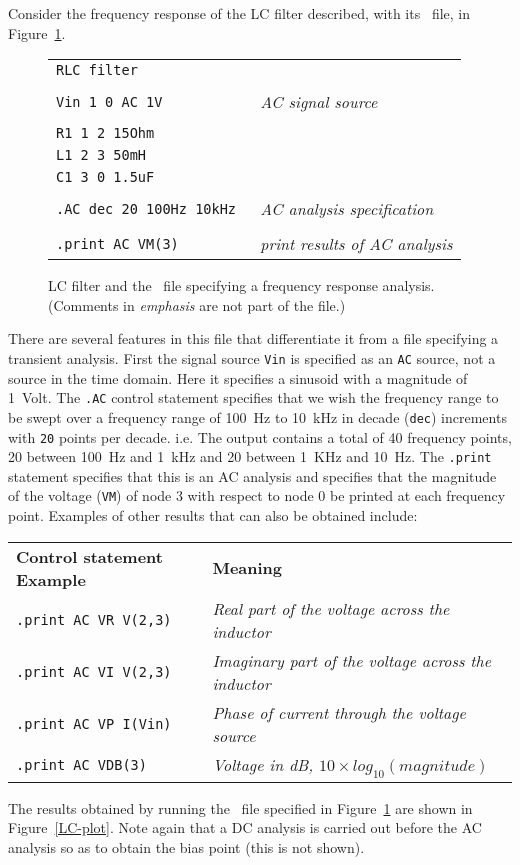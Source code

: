 Consider the frequency response of the LC filter described, with
its \spice\ file, in Figure~\ref{LC}.
%
\begin{figure}
\centerline{}
\par\noindent
\begin{center}
\begin{tabular}{ll}
{\tt RLC filter} & \\
{\tt * } & \\
{\tt Vin 1 0 AC 1V } & {\em AC signal source} \\
{\tt * } & \\
{\tt R1 1 2 15Ohm } & \\
{\tt L1 2 3 50mH } & \\
{\tt C1 3 0 1.5uF } & \\
{\tt * } & \\
{\tt .AC dec 20 100Hz 10kHz } & {\em AC analysis specification}\\
{\tt * } & \\
{\tt .print AC VM(3) } & {\em print results of AC analysis} \\
\end{tabular}
\end{center}
\caption{LC filter and the \spice\ file specifying a frequency response
analysis.  (Comments in {\em emphasis} are not part of the file.)}
\label{LC}
\end{figure}
%
There are several features in this file that differentiate it from
a file specifying a transient analysis.  First the signal source {\tt  Vin}
is specified as an {\tt AC} source, not a source in the time domain.
Here it specifies a sinusoid with a magnitude of 1~Volt.  The {\tt .AC} control
statement specifies that
we wish the frequency range to be swept over a frequency range of
100~Hz to 10~kHz in decade ({\tt dec})
increments with {\tt 20} points per decade.
i.e. The output contains a total of 40 frequency points,
20 between 100~Hz and 1~kHz
and 20 between 1~KHz and 10~Hz.  The {\tt .print} statement specifies
that this is an AC analysis and specifies that the magnitude of the voltage
({\tt VM}) of node 3 with respect to node 0 be printed at each frequency
point.  Examples of other results that can also be obtained include:
\begin{center}
\begin{tabular}{ll}
{\bf Control statement Example} & {\bf Meaning} \\
{\tt .print AC VR V(2,3)} & {\em Real part of the voltage across the inductor} \\
{\tt .print AC VI V(2,3)} & {\em Imaginary part of the voltage across the inductor} \\
{\tt .print AC VP I(Vin)} & {\em Phase of current through the voltage source} \\
{\tt .print AC VDB(3)} & {\em Voltage in dB, $10\times log_{10}(magnitude)$}
\end{tabular}
\end{center}
The results obtained by running the \spice\ file specified in Figure~\ref{LC}
are shown in Figure~\ref{LC-plot}.  Note again that a DC analysis is carried
out
before the AC analysis so as to obtain the bias point (this is not shown).

